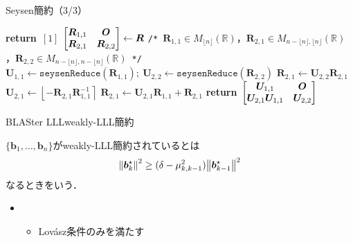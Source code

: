 \documentclass[12pt,aspectratio=169,table,dvipdfmx, leqno]{beamer}
\renewcommand{\Comment}[1]{\quad\texttt{/*}~#1~\texttt{*/}}
\newcommand{\round}[1]{\left\lfloor #1 \right\rceil}
\begin{document}
\begin{frame}{Seysen簡約（3/3）}
\begin{algorithm}[H]
    \footnotesize
    \begin{algorithmic}[1]
        \caption{\footnotesize Seysen簡約\cite{DPS25}}
        \label{alg_seysen}
            \State \textbf{return}~$[1]$
        \EndIf
        \State $\mqty[\bm{R}_{1, 1} & \bm{O}\\ \bm{R}_{2, 1} & \bm{R}_{2, 2}]\gets \bm{R}$ \Comment{$\bm{R}_{1, 1}\in M_{\lfloor n\rfloor}(\mathbb{R})$，$\bm{R}_{2, 1}\in M_{n-\lfloor n\rfloor, \lfloor n\rfloor}(\mathbb{R})$，$\bm{R}_{2, 2}\in M_{n-\lfloor n\rfloor, n-\lfloor n\rfloor}(\mathbb{R})$}
        \State $\bm{U}_{1, 1}\gets \texttt{seysenReduce}(\bm{R}_{1, 1});~\bm{U}_{2, 2}\gets \texttt{seysenReduce}(\bm{R}_{2, 2})$
        \State $\bm{R}_{2, 1}\gets \bm{U}_{2, 2}\bm{R}_{2, 1}$
        \State $\bm{U}_{2, 1}\gets \round{-\bm{R}_{2, 1}\bm{R}_{1, 1}^{-1}}$
        \State $\bm{R}_{2, 1}\gets \bm{U}_{2, 1}\bm{R}_{1, 1}+\bm{R}_{2, 1}$
        \State \textbf{return}~$\mqty[\bm{U}_{1, 1} & \bm{O}\\ \bm{U}_{2, 1}\bm{U}_{1, 1} & \bm{U}_{2, 2}]$
    \end{algorithmic}
\end{algorithm}
\end{frame}

\begin{frame}{BLASter LLL}{weakly-LLL簡約}
\begin{definition}
    $\{\bm{b}_1,\ldots,\bm{b}_n\}$がweakly-LLL簡約されているとは
    \[
        \norm{\bm{b}_k^\star}^2\ge (\delta - \mu_{k, k-1}^2)\norm{\bm{b}_{k-1}^\star}^2
    \]
    なるときをいう．
    \begin{itemize}
        \item[\quad]
        \begin{itemize}
            \item Lov\'asz条件のみを満たす
        \end{itemize}
    \end{itemize}
\end{definition}
\end{frame}
\end{document}
